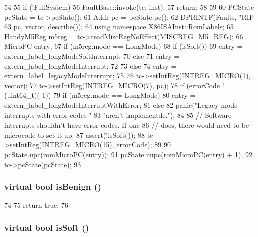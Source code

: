 \begin{DoxyCode}
54     {
55         if (!FullSystem) {
56             FaultBase::invoke(tc, inst);
57             return;
58         }
59 
60         PCState pcState = tc->pcState();
61         Addr pc = pcState.pc();
62         DPRINTF(Faults, "RIP %
63                 pc, vector, describe());
64         using namespace X86ISAInst::RomLabels;
65         HandyM5Reg m5reg = tc->readMiscRegNoEffect(MISCREG_M5_REG);
66         MicroPC entry;
67         if (m5reg.mode == LongMode) {
68             if (isSoft()) {
69                 entry = extern_label_longModeSoftInterrupt;
70             } else {
71                 entry = extern_label_longModeInterrupt;
72             }
73         } else {
74             entry = extern_label_legacyModeInterrupt;
75         }
76         tc->setIntReg(INTREG_MICRO(1), vector);
77         tc->setIntReg(INTREG_MICRO(7), pc);
78         if (errorCode != (uint64_t)(-1)) {
79             if (m5reg.mode == LongMode) {
80                 entry = extern_label_longModeInterruptWithError;
81             } else {
82                 panic("Legacy mode interrupts with error codes "
83                         "aren't implementde.\n");
84             }
85             // Software interrupts shouldn't have error codes. If one
86             // does, there would need to be microcode to set it up.
87             assert(!isSoft());
88             tc->setIntReg(INTREG_MICRO(15), errorCode);
89         }
90         pcState.upc(romMicroPC(entry));
91         pcState.nupc(romMicroPC(entry) + 1);
92         tc->pcState(pcState);
93     }
\end{DoxyCode}
\hypertarget{classX86ISA_1_1X86FaultBase_a3f9ecaf4044752e713522ecf7d8be3b3}{
\subsubsection[{isBenign}]{\setlength{\rightskip}{0pt plus 5cm}virtual bool isBenign ()}}
\label{classX86ISA_1_1X86FaultBase_a3f9ecaf4044752e713522ecf7d8be3b3}



\begin{DoxyCode}
74         {
75             return true;
76         }
\end{DoxyCode}
\hypertarget{classX86ISA_1_1X86FaultBase_a097619346ac87f9db97e3fdd59b81466}{
\subsubsection[{isSoft}]{\setlength{\rightskip}{0pt plus 5cm}virtual bool isSoft ()}}
\label{classX86ISA_1_1X86FaultBase_a097619346ac87f9db97e3fdd59b81466}


